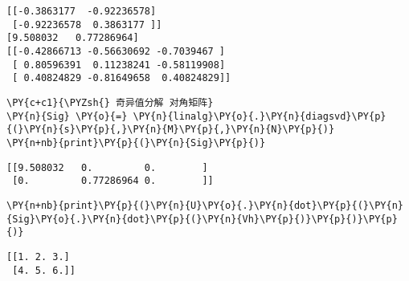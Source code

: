     \begin{Verbatim}[commandchars=\\\{\}]
[[-0.3863177  -0.92236578]
 [-0.92236578  0.3863177 ]]
[9.508032   0.77286964]
[[-0.42866713 -0.56630692 -0.7039467 ]
 [ 0.80596391  0.11238241 -0.58119908]
 [ 0.40824829 -0.81649658  0.40824829]]
    \end{Verbatim}

    \begin{tcolorbox}[breakable, size=fbox, boxrule=1pt, pad at break*=1mm,colback=cellbackground, colframe=cellborder]
\begin{Verbatim}[commandchars=\\\{\}]
\PY{c+c1}{\PYZsh{} 奇异值分解 对角矩阵}
\PY{n}{Sig} \PY{o}{=} \PY{n}{linalg}\PY{o}{.}\PY{n}{diagsvd}\PY{p}{(}\PY{n}{s}\PY{p}{,}\PY{n}{M}\PY{p}{,}\PY{n}{N}\PY{p}{)}
\PY{n+nb}{print}\PY{p}{(}\PY{n}{Sig}\PY{p}{)}
\end{Verbatim}
\end{tcolorbox}

    \begin{Verbatim}[commandchars=\\\{\}]
[[9.508032   0.         0.        ]
 [0.         0.77286964 0.        ]]
    \end{Verbatim}

    \begin{tcolorbox}[breakable, size=fbox, boxrule=1pt, pad at break*=1mm,colback=cellbackground, colframe=cellborder]
\begin{Verbatim}[commandchars=\\\{\}]
\PY{n+nb}{print}\PY{p}{(}\PY{n}{U}\PY{o}{.}\PY{n}{dot}\PY{p}{(}\PY{n}{Sig}\PY{o}{.}\PY{n}{dot}\PY{p}{(}\PY{n}{Vh}\PY{p}{)}\PY{p}{)}\PY{p}{)}
\end{Verbatim}
\end{tcolorbox}

    \begin{Verbatim}[commandchars=\\\{\}]
[[1. 2. 3.]
 [4. 5. 6.]]
    \end{Verbatim}

